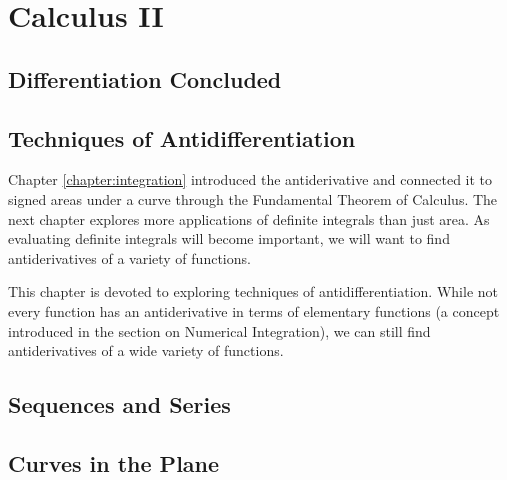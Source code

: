 \part{Calculus II}

\clearpage{\pagestyle{empty}\cleardoublepage}
\chapter{Differentiation Concluded}\label{chapter:diff_conc}
\thispagestyle{empty}

%
%
%



\clearpage{\pagestyle{empty}\cleardoublepage}
\chapter{Techniques of Antidifferentiation}\label{chapter:anti_tech}
\thispagestyle{empty}
Chapter \ref{chapter:integration} introduced the antiderivative and connected it to signed areas under a curve through the Fundamental Theorem of Calculus. The next chapter explores more applications of definite integrals than just area. As evaluating definite integrals will become important, we will want to find antiderivatives of a variety of functions.

This chapter is devoted to exploring techniques of antidifferentiation. While not every function has an antiderivative in terms of elementary functions (a concept introduced in the section on Numerical Integration), we can still find antiderivatives of a wide variety of functions.







\clearpage{\pagestyle{empty}\cleardoublepage}
\chapter{Sequences and Series}\label{chapter:sequences_series}
\thispagestyle{empty}









\clearpage{\pagestyle{empty}\cleardoublepage}
\chapter{Curves in the Plane}
\thispagestyle{empty}





